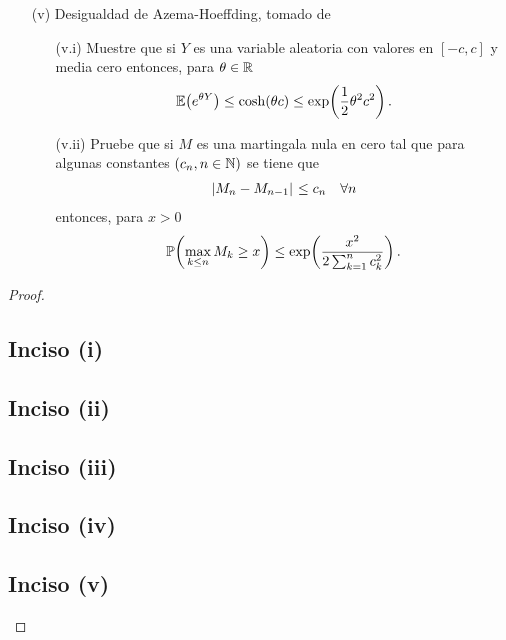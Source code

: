 \begin{problema}
\begin{enumerate}
		\item[(v)]
			Desigualdad de Azema-Hoeffding, tomado de \cite[E14.2, p.237]{MR1155402}
			\begin{enumerate}
				\item[(v.i)] Muestre que si $Y$ es una variable aleatoria con valores en $[-c,c]$ y media cero entonces, para $\theta\in\mathbb{R}$
						\begin{align}
							\mathbb{E}\! \left( e^{\theta Y} \right)\leq\cosh\!\left( \theta c\right) \leq \exp\!\left( \frac{1}{2}\theta^2c^2\right) . 
						\end{align}
				\item[(v.ii)] Pruebe que si $M$ es una martingala nula en cero tal que para algunas constantes $\left( c_n,n\in\mathbb{N}\right) $ se tiene que
						\begin{align}
							\hspace{.25mm}\left|M_n-M_{n-1}\right|\hspace{.25mm}\leq c_n\quad\forall n
						\end{align}
						entonces, para $x>0$
						\begin{align}
							\mathbb{P}\! \left( \max_{k\leq n} M_k\geq x \right)\leq \exp\!\left( \frac{x^2}{2\sum_{k=1}^n c_k^2}\right) .
						\end{align}
			\end{enumerate}
	\end{enumerate}
\end{problema}

\begin{proof}
	\subsection{Inciso (i)} 
	
	\newpage
	
	\subsection{Inciso (ii)} 
	
	\newpage
		
	\subsection{Inciso (iii)} \label{problema2_3:inciso3}
	
	\newpage
	
	\subsection{Inciso (iv)} 
	
	\newpage
	
	\subsection{Inciso (v)}
	
\end{proof}